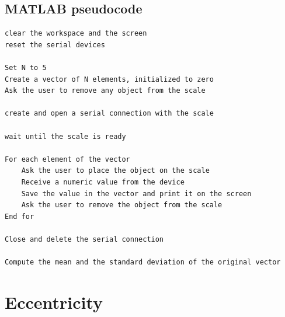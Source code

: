 \clearpage

\subsection{MATLAB pseudocode}

\begin{verbatim}
clear the workspace and the screen
reset the serial devices

Set N to 5
Create a vector of N elements, initialized to zero
Ask the user to remove any object from the scale

create and open a serial connection with the scale

wait until the scale is ready

For each element of the vector
    Ask the user to place the object on the scale
    Receive a numeric value from the device
    Save the value in the vector and print it on the screen
    Ask the user to remove the object from the scale
End for

Close and delete the serial connection

Compute the mean and the standard deviation of the original vector
\end{verbatim}
\clearpage

\section{Eccentricity}

